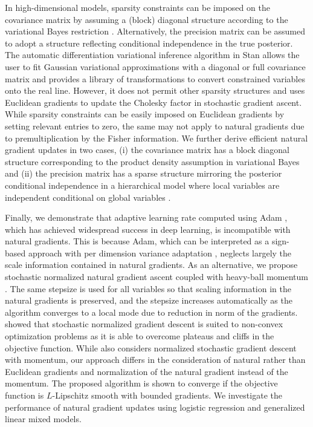 \documentclass{statsoc}
\begin{document}
In high-dimensional models, sparsity constraints can be imposed on the covariance matrix by assuming a (block) diagonal structure according to the variational Bayes restriction \citep{Attias1999}. Alternatively, the precision matrix can be assumed to adopt a structure reflecting conditional independence in the true posterior. The automatic differentiation variational inference algorithm in Stan \citep{Kucukelbir2017} allows the user to fit Gaussian variational approximations with a diagonal or full covariance matrix and provides a library of transformations to convert constrained variables onto the real line. However, it does not permit other sparsity structures and uses Euclidean gradients to update the Cholesky factor in stochastic gradient ascent. While sparsity constraints can be easily imposed on Euclidean gradients by setting relevant entries to zero, the same may not apply to natural gradients due to premultiplication by the Fisher information. We further derive efficient natural gradient updates in two cases, (i) the covariance matrix has a block diagonal structure corresponding to the product density assumption in variational Bayes and (ii) the precision matrix has a sparse structure mirroring the posterior conditional independence in a hierarchical model where local variables are independent conditional on global variables \citep{Tan2018}. 

Finally, we demonstrate that adaptive learning rate computed using Adam \citep{Kingma2015}, which has achieved widespread success in deep learning, is incompatible with natural gradients. This is because Adam, which can be interpreted as a sign-based approach with per dimension variance adaptation \citep{Balles2018}, neglects largely the scale information contained in natural gradients. As an alternative, we propose stochastic normalized natural gradient ascent coupled with heavy-ball momentum \citep{Polyak1964}. The same stepsize is used for all variables so that scaling information in the natural gradients is preserved, and the stepsize increases automatically as the algorithm converges to a local mode due to reduction in norm of the gradients. \cite{Hazan2015} showed that stochastic normalized gradient descent is suited to non-convex optimization problems as it is able to overcome plateaus and cliffs in the objective function. While \cite{Cutkosky2020} also considers normalized stochastic gradient descent with momentum, our approach differs in the consideration of natural rather than Euclidean gradients and normalization of the natural gradient instead of the momentum. The proposed algorithm is shown to converge if the objective function is $L$-Lipschitz smooth with bounded gradients. We investigate the performance of natural gradient updates using logistic regression and generalized linear mixed models. 
\end{document}
